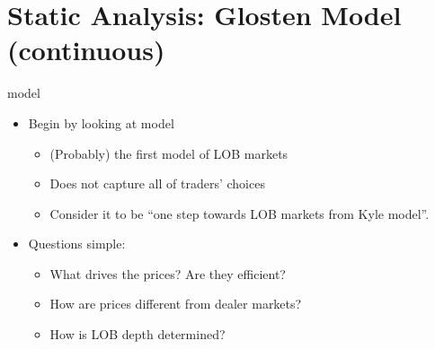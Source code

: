 \documentclass[english,10pt
,aspectratio=169
]{beamer}
\begin{document}



\section{Static Analysis: Glosten Model (continuous)}

\begin{frame}{\cite{glosten_is_1994} model}
	\begin{itemize}
		\item Begin by looking at \cite{glosten_is_1994} model
		\begin{itemize}
			\item (Probably) the first model of LOB markets
			\item Does not capture all of traders' choices
			\item Consider it to be ``one step towards LOB markets from Kyle model''.
		\end{itemize}
		\item Questions simple:
		\begin{itemize}
			\item What drives the prices? Are they efficient?
			\item How are prices different from dealer markets?
			\item How is LOB depth determined?
		\end{itemize}
	\end{itemize}
\end{frame}
\end{document}

